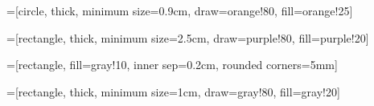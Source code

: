 
\centering

=[circle,
                                                thick,
                                                minimum size=0.9cm,
                                                draw=orange!80,
                                                fill=orange!25]

=[rectangle,
                                    thick,
                                    minimum size=2.5cm,
                                    draw=purple!80,
                                    fill=purple!20]
                                    
=[rectangle,
                                                fill=gray!10,
                                                inner sep=0.2cm,
                                                rounded corners=5mm]

=[rectangle,
                                    thick,
                                    minimum size=1cm,
                                    draw=gray!80,
                                    fill=gray!20]


